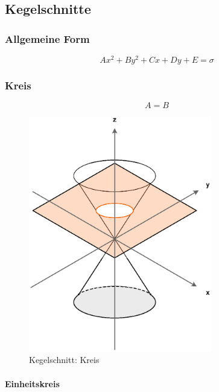 \subsection{Kegelschnitte}

\subsubsection{Allgemeine Form}

\[
    A x^2 + B y^2 + C x + D y + E = \sigma
\]

\subsubsection{Kreis}

\[
    A = B
\]

\begin{figure}[H]
    \centering
    \includegraphics[width=8cm]{grafiken/kegelschnitte/kreis}
    \caption{Kegelschnitt: Kreis}
\end{figure}

\paragraph{Einheitskreis}

